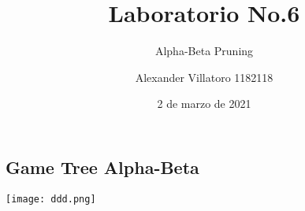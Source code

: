 \documentclass[]{scrreprt}
\begin{document}
\title{Laboratorio No.6}
\subtitle{Alpha-Beta Pruning}
\author{Alexander Villatoro 1182118}
\date {2 de marzo de 2021}

\maketitle

\subsection{Game Tree Alpha-Beta}
\texttt{[image: ddd.png]}
\end{document}
